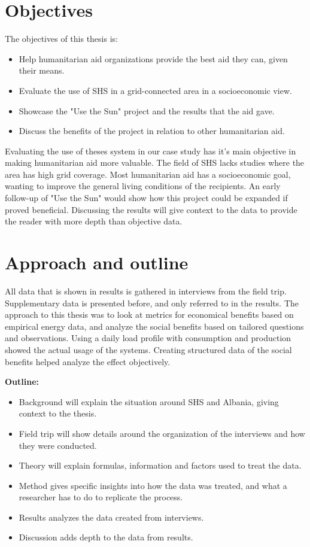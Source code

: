 \section{Objectives}
The objectives of this thesis is:
\begin{itemize}
\item Help humanitarian aid organizations provide the best aid they can, given their means.
\item Evaluate the use of SHS in a grid-connected area in a socioeconomic view.
\item Showcase the "Use the Sun" project and the results that the aid gave. 
\item Discuss the benefits of the project in relation to other humanitarian aid.
\end{itemize}
Evaluating the use of theses system in our case study has it's main objective in making humanitarian aid more valuable. The field of SHS lacks studies where the area has high grid coverage. Most humanitarian aid has a socioeconomic goal, wanting to improve the general living conditions of the recipients. An early follow-up of "Use the Sun" would show how this project could be expanded if proved beneficial. Discussing the results will give context to the data to provide the reader with more depth than objective data. 

\section{Approach and outline}
All data that is shown in results is gathered in interviews from the field trip. Supplementary data is presented before, and only referred to in the results. The approach to this thesis was to look at metrics for economical benefits based on empirical energy data, and analyze the social benefits based on tailored questions and observations. Using a daily load profile with consumption and production showed the actual usage of the systems. Creating structured data of the social benefits helped analyze the effect objectively. 

\textbf{Outline:}
\begin{itemize}
\item Background will explain the situation around SHS and Albania, giving context to the thesis.
\item Field trip will show details around the organization of the interviews and how they were conducted.
\item Theory will explain formulas, information and factors used to treat the data.
\item Method gives specific insights into how the data was treated, and what a researcher has to do to replicate the process. 
\item Results analyzes the data created from interviews.
\item Discussion adds depth to the data from results.
\end{itemize}







